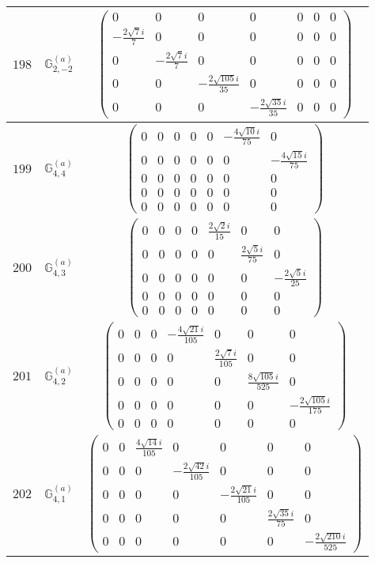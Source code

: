 \documentclass[fleqn,8pt,landscape]{jsarticle}
\begin{document}
\begin{center}
\begin{longtable}{ccc}
$ 198 $ & $ \mathbb{G}_{2,-2}^{(a)} $ & $ \begin{pmatrix} 0 & 0 & 0 & 0 & 0 & 0 & 0 \\ - \frac{2 \sqrt{7} i}{7} & 0 & 0 & 0 & 0 & 0 & 0 \\ 0 & - \frac{2 \sqrt{7} i}{7} & 0 & 0 & 0 & 0 & 0 \\ 0 & 0 & - \frac{2 \sqrt{105} i}{35} & 0 & 0 & 0 & 0 \\ 0 & 0 & 0 & - \frac{2 \sqrt{35} i}{35} & 0 & 0 & 0 \end{pmatrix} $ \\ \hline
$ 199 $ & $ \mathbb{G}_{4,4}^{(a)} $ & $ \begin{pmatrix} 0 & 0 & 0 & 0 & 0 & - \frac{4 \sqrt{10} i}{75} & 0 \\ 0 & 0 & 0 & 0 & 0 & 0 & - \frac{4 \sqrt{15} i}{75} \\ 0 & 0 & 0 & 0 & 0 & 0 & 0 \\ 0 & 0 & 0 & 0 & 0 & 0 & 0 \\ 0 & 0 & 0 & 0 & 0 & 0 & 0 \end{pmatrix} $ \\ \hline
$ 200 $ & $ \mathbb{G}_{4,3}^{(a)} $ & $ \begin{pmatrix} 0 & 0 & 0 & 0 & \frac{2 \sqrt{2} i}{15} & 0 & 0 \\ 0 & 0 & 0 & 0 & 0 & \frac{2 \sqrt{5} i}{75} & 0 \\ 0 & 0 & 0 & 0 & 0 & 0 & - \frac{2 \sqrt{5} i}{25} \\ 0 & 0 & 0 & 0 & 0 & 0 & 0 \\ 0 & 0 & 0 & 0 & 0 & 0 & 0 \end{pmatrix} $ \\ \hline
$ 201 $ & $ \mathbb{G}_{4,2}^{(a)} $ & $ \begin{pmatrix} 0 & 0 & 0 & - \frac{4 \sqrt{21} i}{105} & 0 & 0 & 0 \\ 0 & 0 & 0 & 0 & \frac{2 \sqrt{7} i}{105} & 0 & 0 \\ 0 & 0 & 0 & 0 & 0 & \frac{8 \sqrt{105} i}{525} & 0 \\ 0 & 0 & 0 & 0 & 0 & 0 & - \frac{2 \sqrt{105} i}{175} \\ 0 & 0 & 0 & 0 & 0 & 0 & 0 \end{pmatrix} $ \\ \hline
$ 202 $ & $ \mathbb{G}_{4,1}^{(a)} $ & $ \begin{pmatrix} 0 & 0 & \frac{4 \sqrt{14} i}{105} & 0 & 0 & 0 & 0 \\ 0 & 0 & 0 & - \frac{2 \sqrt{42} i}{105} & 0 & 0 & 0 \\ 0 & 0 & 0 & 0 & - \frac{2 \sqrt{21} i}{105} & 0 & 0 \\ 0 & 0 & 0 & 0 & 0 & \frac{2 \sqrt{35} i}{75} & 0 \\ 0 & 0 & 0 & 0 & 0 & 0 & - \frac{2 \sqrt{210} i}{525} \end{pmatrix} $ \\ \hline

\end{longtable}
\end{center}
\end{document}
